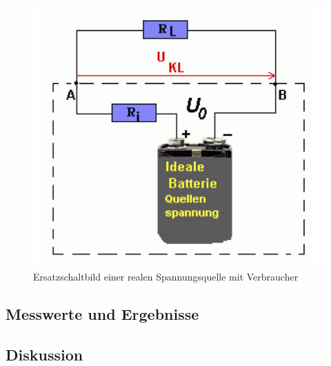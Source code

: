 \documentclass[12pt,a4paper]{article}
\begin{document}
\begin{multicols}{2}
\begin{figure}[H]
	\centering
	\includegraphics[scale=0.80]{./figure/innenwiderstand_schaltskizze.png}
	\caption{Ersatzschaltbild einer realen Spannungsquelle mit Verbraucher}
	\label{fig:innenwiderstand_schaltskizze}
\end{figure}







\subsection{Messwerte und Ergebnisse}


\subsection{Diskussion}



\end{multicols}
\end{document}
